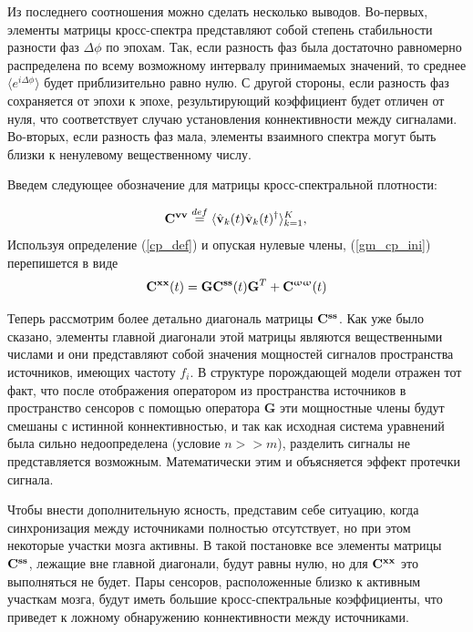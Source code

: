 Из последнего соотношения можно сделать несколько выводов.
Во-первых, элементы матрицы кросс-спектра представляют собой степень стабильности
разности фаз $\Delta\phi$ по эпохам.
Так, если разность фаз была достаточно равномерно распределена по всему возможному
интервалу принимаемых значений, то среднее $\langle e^{i\Delta\phi} \rangle$
будет приблизительно равно нулю.
С другой стороны, если разность фаз сохраняется от эпохи к эпохе,
результирующий коэффициент будет отличен от нуля,
что соответствует случаю установления коннективности между сигналами.
Во-вторых, если разность фаз мала,
элементы взаимного спектра могут быть близки к ненулевому вещественному числу.

Введем следующее обозначение для матрицы кросс-спектральной плотности:

\begin{equation}
    \mathbf{C}^{\mathbf{v v}} \stackrel{def}{=} \langle{\hat{\mathbf{v}}_k(t) \hat{\mathbf{v}}_k(t)^{\dag}}\rangle_{k=1}^K, \\
    \label{cp_def}
\end{equation}
Используя определение (\ref{cp_def}) и опуская нулевые члены, (\ref{gm_cp_ini})
перепишется в виде
\begin{equation}
    \mathbf{C}^{\mathbf{x x}}(t) = \mathbf{G} \mathbf{C}^{\mathbf{s s}}(t) \mathbf{G}^T + \mathbf{C}^{\mathbf{\upomega \upomega}}(t)
    \label{gm_cp_matr}
\end{equation}

Теперь рассмотрим более детально диагональ матрицы $\mathbf{C}^{\mathbf{s s}}$.
Как уже было сказано, элементы главной диагонали этой матрицы являются вещественными числами
и они представляют собой значения мощностей сигналов пространства источников,
имеющих частоту $f_i$. В структуре порождающей модели отражен тот факт,
что после отображения оператором из пространства источников в пространство сенсоров
с помощью оператора $\mathbf{G}$ эти мощностные члены будут смешаны с истинной коннективностью,
и так как исходная система уравнений была сильно недоопределена (условие $n >> m$),
разделить сигналы не представляется возможным.
Математически этим и объясняется эффект протечки сигнала.

Чтобы внести дополнительную ясность, представим себе ситуацию,
когда синхронизация между источниками полностью отсутствует,
но при этом некоторые участки мозга активны.
В такой постановке все элементы матрицы $\mathbf{C}^{\mathbf{s s}}$, лежащие вне главной диагонали,
будут равны нулю, но для $\mathbf{C}^{\mathbf{x x}}$ это выполняться не будет.
Пары сенсоров, расположенные близко к активным участкам мозга,
будут иметь большие кросс-спектральные коэффициенты,
что приведет к ложному обнаружению коннективности между источниками.

